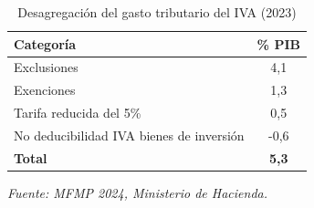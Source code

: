 \begin{table}[h]
\centering
\caption{Desagregación del gasto tributario del IVA (2023)}
\label{tab:des_gt_iva}
\begin{tabular}{|l|c|}
\hline
\textbf{Categoría} & \textbf{\% PIB} \\
\hline
Exclusiones & 4,1 \\
Exenciones & 1,3 \\
Tarifa reducida del 5\% & 0,5 \\
No deducibilidad IVA bienes de inversión & -0,6 \\
\hline
\textbf{Total} & \textbf{5,3} \\
\hline
\end{tabular}
\vspace{0.1cm}
\par \footnotesize{\textit{Fuente: MFMP 2024, Ministerio de Hacienda.}}
\end{table}

